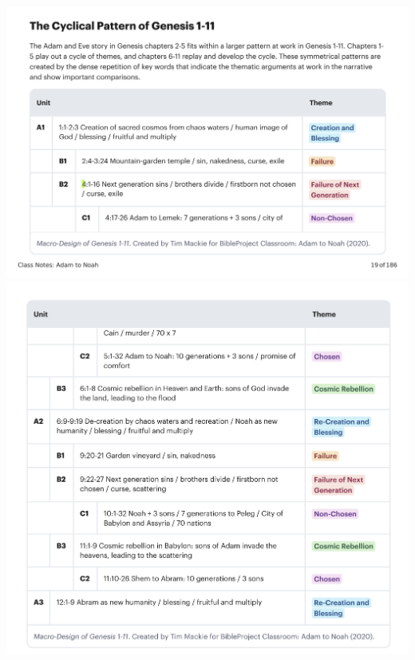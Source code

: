 \documentclass[11pt]{article}
\begin{document}
\begin{center}
\includegraphics[width=.86\textwidth]{table1.png}
\includegraphics[width=.86\textwidth]{table2.png}
\end{center}
\end{document}
